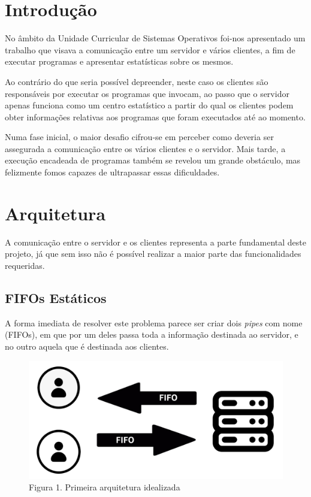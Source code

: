 \documentclass[12pt,a4paper]{report}
\begin{document}


\tableofcontents

\chapter{Introdução}

    No âmbito da Unidade Curricular de Sistemas Operativos foi-nos apresentado um trabalho que visava a comunicação entre um servidor e vários clientes, a fim de executar programas e apresentar estatísticas sobre os mesmos.

    Ao contrário do que seria possível depreender, neste caso os clientes são responsáveis por executar os programas que invocam, ao passo que o servidor apenas funciona como um centro estatístico a partir do qual os clientes podem obter informações relativas aos programas que foram executados até ao momento.

    Numa fase inicial, o maior desafio cifrou-se em perceber como deveria ser assegurada a comunicação entre os vários clientes e o servidor. Mais tarde, a execução encadeada de programas também se revelou um grande obstáculo, mas felizmente fomos capazes de ultrapassar essas dificuldades.


\chapter{Arquitetura}

    A comunicação entre o servidor e os clientes representa a parte fundamental deste projeto, já que sem isso não é possível realizar a maior parte das funcionalidades requeridas.

    \section{FIFOs Estáticos}

        A forma imediata de resolver este problema parece ser criar dois \textit{pipes} com nome (FIFOs), em que por um deles passa toda a informação destinada ao servidor, e no outro aquela que é destinada aos clientes.

        \begin{figure}[hb!]
            \centering
            \includegraphics{images/arq1.png}
            \caption*{Figura 1. Primeira arquitetura idealizada}
            \label{fig:Arq1}
        \end{figure}
\end{document}

